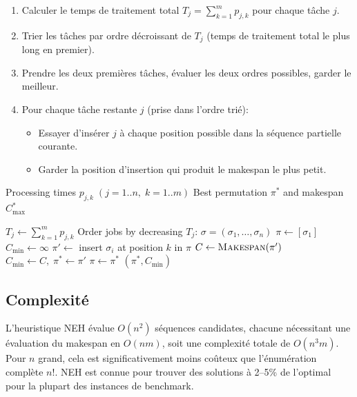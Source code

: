 \documentclass[12pt,a4paper,oneside]{report}
\begin{document}
\begin{enumerate}[itemsep=4pt]
    \item Calculer le temps de traitement total $T_j = \sum_{k=1}^{m} p_{j,k}$ pour chaque t\^ache $j$.
    \item Trier les t\^aches par ordre d\'ecroissant de $T_j$ (temps de traitement total le plus long en premier).
    \item Prendre les deux premi\`eres t\^aches, \'evaluer les deux ordres possibles, garder le meilleur.
    \item Pour chaque t\^ache restante $j$ (prise dans l'ordre tri\'e):
    \begin{itemize}
        \item Essayer d'ins\'erer $j$ \`a chaque position possible dans la s\'equence partielle courante.
        \item Garder la position d'insertion qui produit le makespan le plus petit.
    \end{itemize}
\end{enumerate}

\begin{algorithm}[H]
\caption{Heuristique NEH}
\begin{algorithmic}[1]
\Require Processing times $p_{j,k}\;(j=1..n,\;k=1..m)$
\Ensure Best permutation $\pi^*$ and makespan $C_{\max}^*$

    \State $T_j \gets \sum_{k=1}^{m} p_{j,k}$
\EndFor
\State Order jobs by decreasing $T_j$: $\sigma = (\sigma_1, \dots, \sigma_n)$
\State $\pi \gets [\sigma_1]$
    \State $C_{\min} \gets \infty$
        \State $\pi' \gets$ insert $\sigma_i$ at position $k$ in $\pi$
        \State $C \gets \textsc{Makespan}(\pi')$
            \State $C_{\min} \gets C,\; \pi^* \gets \pi'$
        \EndIf
    \EndFor
    \State $\pi \gets \pi^*$
\EndFor
\State \Return $(\pi^*, C_{\min})$
\end{algorithmic}
\end{algorithm}

\subsection{Complexit\'e}

L'heuristique NEH \'evalue $O(n^2)$ s\'equences candidates, chacune n\'ecessitant une \'evaluation du makespan en $O(nm)$, soit une complexit\'e totale de $O(n^3 m)$. Pour $n$ grand, cela est significativement moins co\^uteux que l'\'enum\'eration compl\`ete $n!$. NEH est connue pour trouver des solutions \`a 2--5\% de l'optimal pour la plupart des instances de benchmark.
\end{document}
